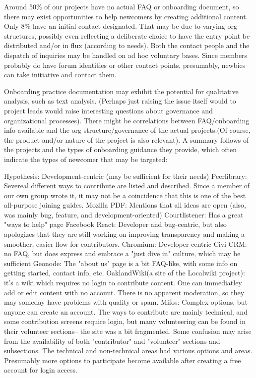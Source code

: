 Around 50\% of our projects have no actual FAQ or onboarding document, so there may exist opportunities to help newcomers by creating additional content. Only 8\% have an initial contact designated. That may be due to varying org structures, possibly even reflecting a deliberate choice to have the entry point be distributed and/or in flux (according to needs). Both the contact people and the dispatch of inquiries may be handled on ad hoc voluntary bases. Since members probably do have forum identities or other contact points, presumably, newbies can take initiative and contact them.

Onboarding practice documentation may exhibit the potential for qualitative analysis, such as text analysis. (Perhaps just raising the issue itself would to project leads would raise interesting questions about governance and organizational processes). There might be correlations between FAQ/onboarding info available and the org structure/governance of the actual projects.(Of course, the product and/or nature of the project is also relevant). A summary follows of the projects and the types of onboarding guidance they provide, which often indicate the types of newcomer that may be targeted:

Hypothesis: Development-centric (may be sufficient for their needs)
Peerlibrary: Severeal different ways to contribute are listed and described. Since a member of our own group wrote it, it may not be a coincidence that this is one of the best all-purpose joining guides.
Mozilla PDF: Mentions that all ideas are open (also, was mainly bug, feature, and development-oriented)
Courtlistener: Has a great "ways to help" page
Facebook React: Developer and bug-centric, but also apologizes that they are still working on improving transparency and making a smoother, easier flow for contributors.
Chromium: Developer-centric
Civi-CRM: no FAQ, but does express and embrace a  "just dive in" culture, which may be sufficient
Geonode: The "about us" page is a bit FAQ-like, with some info on getting started, contact info, etc.
OaklandWiki(a site of the Localwiki project): it's a wiki which requires no login to contribute content. One can immediatley add or edit content with no account. There is no apparent moderation, so they may someday have problems with quality or spam.
Mifos: Complex options, but anyone can create an account. The ways to contribute are mainly technical, and some contribution screens require login, but many volunteering can be found in their volunteer sections-- the site was a bit fragmented. Some confusion may arise from the availability of both "contributor" and "volunteer" sections and subsections. The technical and non-technical areas had various options and areas. Presumably more options to participate become available after creating a free account for login access.


